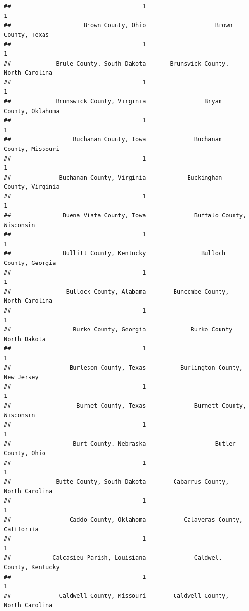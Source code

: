 \documentclass[
]{article}
\begin{document}
\begin{verbatim}
##                                      1                                      1 
##                     Brown County, Ohio                    Brown County, Texas 
##                                      1                                      1 
##             Brule County, South Dakota       Brunswick County, North Carolina 
##                                      1                                      1 
##             Brunswick County, Virginia                 Bryan County, Oklahoma 
##                                      1                                      1 
##                  Buchanan County, Iowa              Buchanan County, Missouri 
##                                      1                                      1 
##              Buchanan County, Virginia            Buckingham County, Virginia 
##                                      1                                      1 
##               Buena Vista County, Iowa              Buffalo County, Wisconsin 
##                                      1                                      1 
##               Bullitt County, Kentucky                Bulloch County, Georgia 
##                                      1                                      1 
##                Bullock County, Alabama        Buncombe County, North Carolina 
##                                      1                                      1 
##                  Burke County, Georgia             Burke County, North Dakota 
##                                      1                                      1 
##                 Burleson County, Texas          Burlington County, New Jersey 
##                                      1                                      1 
##                   Burnet County, Texas              Burnett County, Wisconsin 
##                                      1                                      1 
##                  Burt County, Nebraska                    Butler County, Ohio 
##                                      1                                      1 
##             Butte County, South Dakota        Cabarrus County, North Carolina 
##                                      1                                      1 
##                 Caddo County, Oklahoma           Calaveras County, California 
##                                      1                                      1 
##            Calcasieu Parish, Louisiana              Caldwell County, Kentucky 
##                                      1                                      1 
##              Caldwell County, Missouri        Caldwell County, North Carolina 

\end{verbatim}
\end{document}
